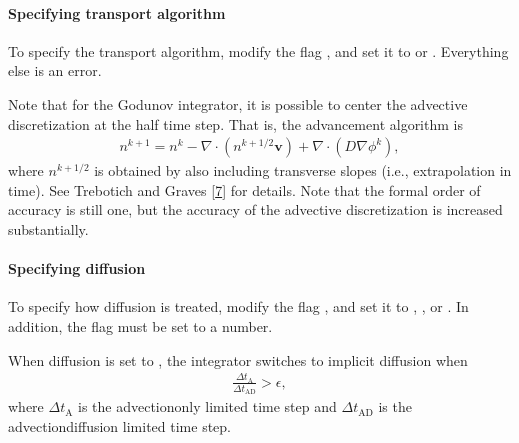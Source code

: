 \documentclass[letterpaper,10pt,english]{sphinxmanual}
\begin{document}
\paragraph{Specifying transport algorithm}
\label{\detokenize{Applications/CdrPlasmaModel:specifying-transport-algorithm}}
To specify the transport algorithm, modify the flag , and set it to  or .
Everything else is an error.

Note that for the Godunov integrator, it is possible to center the advective discretization at the half time step.
That is, the advancement algorithm is
\begin{equation*}
\begin{split}n^{k+1} = n^{k} - \nabla\cdot\left(n^{k+1/2}\mathbf{v}\right) + \nabla\cdot\left(D\nabla\phi^k\right),\end{split}
\end{equation*}
where \(n^{k+1/2}\) is obtained by also including transverse slopes (i.e., extrapolation in time).
See Trebotich and Graves {[}\hyperlink{cite.ZZReferences:id157}{7}{]} for details.
Note that the formal order of accuracy is still one, but the accuracy of the advective discretization is increased substantially.


\paragraph{Specifying diffusion}
\label{\detokenize{Applications/CdrPlasmaModel:specifying-diffusion}}
To specify how diffusion is treated, modify the flag , and set it to , , or .
In addition, the flag  must be set to a number.

When diffusion is set to , the integrator switches to implicit diffusion when
\begin{equation*}
\begin{split}\frac{\Delta t_{\textrm{A}}}{\Delta t_{\textrm{AD}}} > \epsilon,\end{split}
\end{equation*}
where \(\Delta t_{\textrm{A}}\) is the advection\sphinxhyphen{}only limited time step and \(\Delta t_{\textrm{AD}}\) is the advection\sphinxhyphen{}diffusion limited time step.
\end{document}
